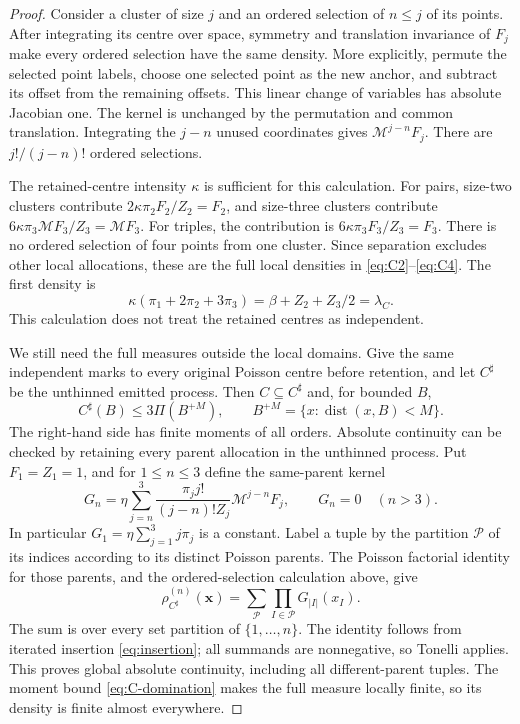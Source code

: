 \documentclass[11pt,a4paper]{article}
\numberwithin{equation}{section}
\theoremstyle{definition}
\theoremstyle{remark}
\newcommand{\Mop}{\mathcal M}
\begin{document}
\begin{proof}
Consider a cluster of size $j$ and an ordered selection of $n\leq j$ of
its points. After integrating its centre over space, symmetry and
translation invariance of $F_j$ make every ordered selection have the
same density. More explicitly, permute the selected point labels, choose
one selected point as the new anchor, and subtract its offset from the
remaining offsets. This linear change of variables has absolute
Jacobian one. The kernel is unchanged by the permutation and common
translation. Integrating the $j-n$ unused coordinates gives
$\Mop^{j-n}F_j$. There are $j!/(j-n)!$ ordered selections.

The retained-centre intensity $\kappa$ is sufficient for this calculation.
For pairs, size-two clusters contribute
$2\kappa\pi_2F_2/Z_2=F_2$, and size-three clusters contribute
$6\kappa\pi_3\Mop F_3/Z_3=\Mop F_3$. For triples, the contribution is
$6\kappa\pi_3F_3/Z_3=F_3$. There is no ordered selection of four points
from one cluster. Since separation excludes other local allocations,
these are the full local densities in \eqref{eq:C2}--\eqref{eq:C4}.
The first density is
\[
 \kappa(\pi_1+2\pi_2+3\pi_3)
 =\beta+Z_2+Z_3/2=\lambda_C.
\]
This calculation does not treat the retained centres as independent.

We still need the full measures outside the local domains. Give the same
independent marks to every original Poisson centre before retention, and
let $C^\sharp$ be the unthinned emitted process. Then $C\subseteq C^\sharp$
and, for bounded $B$,
\begin{equation}
 C^\sharp(B)\leq3\Pi(B^{+M}),
 \qquad B^{+M}=\{x:\operatorname{dist}(x,B)<M\}.
 \label{eq:C-domination}
\end{equation}
The right-hand side has finite moments of all orders. Absolute continuity
can be checked by retaining every parent allocation in the unthinned
process. Put $F_1=Z_1=1$, and for $1\leq n\leq3$ define the same-parent
kernel
\begin{equation}
 G_n=\eta\sum_{j=n}^3
        \frac{\pi_jj!}{(j-n)!Z_j}\Mop^{j-n}F_j,
 \qquad G_n=0\quad(n>3).
 \label{eq:G-kernels}
\end{equation}
In particular $G_1=\eta\sum_{j=1}^3j\pi_j$ is a constant.
Label a tuple by the partition $\mathcal P$ of its indices according to
its distinct Poisson parents. The Poisson factorial identity for those
parents, and the ordered-selection calculation above, give
\begin{equation}
 \rho_{C^\sharp}^{(n)}(\mathbf x)
 =\sum_{\mathcal P}\prod_{I\in\mathcal P}G_{|I|}(x_I).
 \label{eq:all-parent}
\end{equation}
The sum is over every set partition of $\{1,\ldots,n\}$. The identity
follows from iterated insertion \eqref{eq:insertion}; all summands are
nonnegative, so Tonelli applies. This proves global absolute continuity,
including all different-parent tuples. The moment bound
\eqref{eq:C-domination} makes the full measure locally finite, so its
density is finite almost everywhere.


\end{proof}
\end{document}
